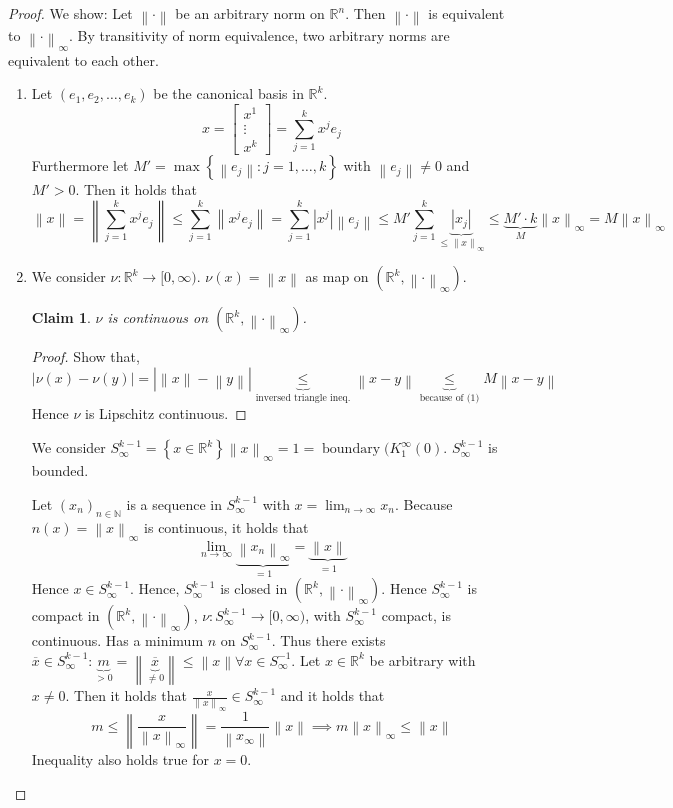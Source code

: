 \documentclass{article}
\newtheorem*{claim}{Claim}%
\newcommand{\set}[1]{\left\{#1\right\}}
\newcommand{\norm}[1]{\left\|#1\right\|}
\newcommand{\card}[1]{\left|#1\right|}
\begin{document}
\begin{proof}
  We show: Let $\norm{\cdot}$ be an arbitrary norm on $\mathbb R^n$. Then $\norm{\cdot}$ is equivalent to $\norm{\cdot}_{\infty}$. By transitivity of norm equivalence, two arbitrary norms are equivalent to each other.
  \begin{enumerate}
    \item Let $(e_1, e_2, \dots, e_k)$ be the canonical basis in $\mathbb R^k$.
      \[ x = \begin{bmatrix} x^1 \\ \vdots \\ x^k \end{bmatrix} = \sum_{j=1}^k x^j e_j \]
      Furthermore let $M' = \max\set{\norm{e_j}: j = 1, \dots, k}$ with $\norm{e_j} \neq 0$ and $M' > 0$.
      Then it holds that
      \[ \norm{x} = \norm{\sum_{j=1}^k x^j e_j} \leq \sum_{j=1}^k \norm{x^j e_j} = \sum_{j=1}^k \card{x^j} \norm{e_j} \leq M' \sum_{j=1}^k \underbrace{\card{x_j}}_{\leq \norm{x}_\infty} \leq \underbrace{M' \cdot k}_{M} \norm{x}_{\infty} = M \norm{x}_\infty \]
    \item
      We consider $\nu: \mathbb R^k \to [0, \infty)$.
      $\nu(x) = \norm{x}$ as map on $(\mathbb R^k, \norm{\cdot}_{\infty})$.

      \begin{claim}
        $\nu$ is continuous on $(\mathbb R^k, \norm{\cdot}_{\infty})$.
      \end{claim}
      \begin{proof}
        Show that,
        \[ \card{\nu(x) - \nu(y)} = \card{\norm{x} - \norm{y}} \underbrace{\leq}_{\text{inversed triangle ineq.}} \norm{x - y} \underbrace{\leq}_{\text{because of (1)}} M \norm{x - y} \]
        Hence $\nu$ is Lipschitz continuous.
      \end{proof}

      We consider $S_{\infty}^{k-1} = \set{x \in \mathbb R^k}{\norm{x}_{\infty} = 1} = \operatorname{boundary}(K_1^\infty(0)$.
      $S_{\infty}^{k-1}$ is bounded.

      Let $(x_n)_{n \in \mathbb N}$ is a sequence in $S_{\infty}^{k-1}$ with $x = \lim_{n\to\infty} x_n$. Because $n(x) = \norm{x}_{\infty}$ is continuous, it holds that
      \[ \lim_{n\to\infty} \underbrace{\norm{x_n}_{\infty}}_{=1} = \underbrace{\norm{x}}_{=1} \]
      Hence $x \in S_{\infty}^{k-1}$. Hence, $S_{\infty}^{k-1}$ is closed in $(\mathbb R^k, \norm{\cdot}_{\infty})$.
      Hence $S_{\infty}^{k-1}$ is compact in $(\mathbb R^k, \norm{\cdot}_{\infty})$, $\nu: S_{\infty}^{k-1} \to [0, \infty)$, with $S_{\infty}^{k-1}$ compact, is continuous.
      Has a minimum $n$ on $S_{\infty}^{k-1}$. Thus there exists $\overline{x} \in S_{\infty}^{k-1}: \underbrace{m}_{> 0} = \norm{\underbrace{\overline{x}}_{\neq 0}} \leq \norm{x} \forall x \in S_{\infty}^{-1}$.
      Let $x \in \mathbb R^k$ be arbitrary with $x \neq 0$. Then it holds that $\frac{x}{\norm{x}_{\infty}} \in S_{\infty}^{k-1}$ and it holds that
      \[ m \leq \norm{\frac{x}{\norm{x}_{\infty}}} = \frac{1}{\norm{x_{\infty}}} \norm{x} \implies m \norm{x}_{\infty} \leq \norm{x} \]
      Inequality also holds true for $x = 0$.
  \end{enumerate}
\end{proof}
\end{document}
